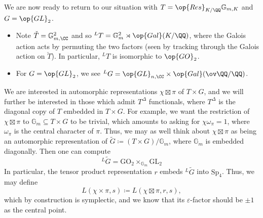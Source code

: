 \documentclass[../notes.tex]{subfiles}
\begin{document}
We are now ready to return to our situation with $T=\op{Res}_{K/\QQ}\mathbb G_{m,K}$ and $G=\op{GL}_2$.
\begin{itemize}
	\item Note $\check T=\mathbb G_{m,\CC}^2$ and so $^LT=\mathbb G_m^2\rtimes\op{Gal}(K/\QQ)$, where the Galois action acts by permuting the two factors (seen by tracking through the Galois action on $\check T$). In particular, $^LT$ is isomorphic to $\op{GO}_2$.
	\item For $G=\op{GL}_2$, we see $^LG=\op{GL}_{n,\CC}\times\op{Gal}(\ov\QQ/\QQ)$.
\end{itemize}
We are interested in automorphic representations $\chi\boxtimes\pi$ of $T\times G$, and we will further be interested in those which admit $T^\Delta$ functionals, where $T^\Delta$ is the diagonal copy of $T$ embedded in $T\times G$. For example, we want the restriction of $\chi\boxtimes\pi$ to $\mathbb G_m\subseteq T\times G$ to be trivial, which amounts to asking for $\chi\omega_\pi=1$, where $\omega_\pi$ is the central character of $\pi$. Thus, we may as well think about $\chi\boxtimes\pi$ as being an automorphic representation of $\widetilde G\coloneqq(T\times G)/\mathbb G_m$, where $\mathbb G_m$ is embedded diagonally. Then one can compute
\[^L\widetilde G=\mathrm{GO}_2\times_{\mathbb G_m}\mathrm{GL}_2\]
In particular, the tensor product representation $r$ embeds $^L\widetilde G$ into $\mathrm{Sp}_4$. Thus, we may define
\[L(\chi\times\pi,s)\coloneqq L(\chi\boxtimes\pi,r,s),\]
which by construction is symplectic, and we know that its $\varepsilon$-factor should be $\pm1$ as the central point.
\end{document}
